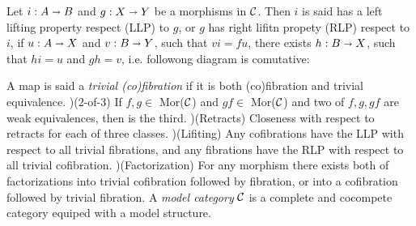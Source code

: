 	 		\begin{center} 
	 		\end{center}
 	 
 	 Let $i : A \shortrightarrow B$ and $ g : X \shortrightarrow Y $ be a morphisms in $\mathcal{C}$. Then $i$ is said has a left lifting property respect (LLP) to $g$, or $g$ has right lifitn propety (RLP) respect to $i$, if $ u : A \shortrightarrow X $ and $ v : B \shortrightarrow Y $, such that $ v i = f u $,
 	 there exists $ h : B \shortrightarrow X $, such that $ h i = u $ and $ g h = v $, i.e. followong diagram is comutative:
 	 
 	 		\begin{center} 
 	 		\end{center}
  			
  	 A map is said a \textit{trivial (co)fibration} if it is both (co)fibration and trivial equivalence.
  	 \newline
  	 )(2-of-3) If $ f, g \in$ Mor($\mathcal{C}$) and $gf \in$ Mor($\mathcal{C}$) and two of $f, g, gf$ are weak equivalences, then is the third.
	 \newline
	 )(Retracts) Closeness with respect to retracts for each of three classes.
	 \newline
	 )(Lifiting) Any cofibrations have the LLP with respect to all trivial fibrations, and any fibrations have the RLP with respect to all trivial cofibration.
	 \newline
	 )(Factorization) For any morphism there exists both of factorizations into trivial cofibration followed by fibration, or
	 into a cofibration followed by trivial fibration.
	 \newline
	 \newline
	 A \textit{model category} $\mathcal{C}$ is a complete and cocompete category equiped with a model structure.
	 
